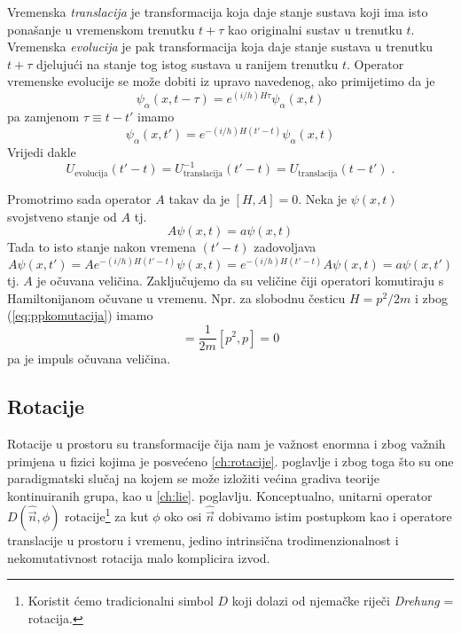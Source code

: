 Vremenska \emph{translacija} je transformacija koja daje
stanje sustava koji ima isto ponašanje u vremenskom
trenutku $t+\tau$ kao originalni sustav u trenutku $t$. Vremenska
\emph{evolucija} je pak transformacija koja 
daje stanje sustava u trenutku $t+\tau$ djelujući na stanje
tog istog sustava u ranijem trenutku $t$.
Operator vremenske evolucije se može dobiti iz upravo
navedenog, ako primijetimo da je
\begin{equation}
\psi_{\alpha}(x,t-\tau)=e^{(i/h)H\tau}\psi_{\alpha}(x,t)
\end{equation}
pa zamjenom $\tau\equiv t-t'$ imamo 
\begin{equation}
\psi_{\alpha}(x,t')=e^{-(i/h)H(t'-t)}\psi_{\alpha}(x,t)
\end{equation}
Vrijedi dakle
\begin{equation}
U_{\text{evolucija}}(t' -t)=U^{-1}_{\text{translacija}}(t' -t)
=U_{\text{translacija}}(t -t') \;.
\end{equation}

Promotrimo sada operator $A$ takav da je
$[H,A]=0$. Neka je $\psi(x,t)$ svojstveno stanje od $A$ tj.
\begin{equation}
  A\psi(x,t) = a \psi(x,t)
\end{equation}
Tada to isto stanje nakon vremena $(t'-t)$ zadovoljava
\begin{equation}
  A\psi(x,t')= A e^{-(i/h)H(t'-t)} \psi(x,t) =
 e^{-(i/h)H(t'-t)} A \psi(x,t) = a \psi(x,t')
\end{equation}
tj. $A$ je očuvana veličina. Zaključujemo da su
veličine čiji operatori komutiraju s Hamiltonijanom očuvane u vremenu.
Npr. za slobodnu česticu $H=p^2/2m$ i zbog (\ref{eq:ppkomutacija}) imamo
\begin{equation}
   [H,p]=\frac{1}{2m}[p^2,p]=0
\end{equation}
pa je impuls očuvana veličina.



\subsection{Rotacije}

Rotacije u prostoru su transformacije čija nam je važnost
enormna i zbog važnih primjena u fizici kojima je posvećeno
\ref{ch:rotacije}. poglavlje i zbog toga što su one paradigmatski
slučaj na kojem se može izložiti većina gradiva teorije kontinuiranih grupa,
kao u \ref{ch:lie}. poglavlju.
Konceptualno, unitarni operator $D(\hat{\vec{n}}, \phi)$
rotacije\footnote{Koristit ćemo
  tradicionalni simbol $D$ koji dolazi od njemačke
riječi \emph{Drehung} = rotacija.} za kut $\phi$ oko osi $\hat{\vec{n}}$ dobivamo
istim postupkom kao i operatore translacije u prostoru i vremenu,
jedino intrinsična trodimenzionalnost i nekomutativnost rotacija
malo komplicira izvod.

